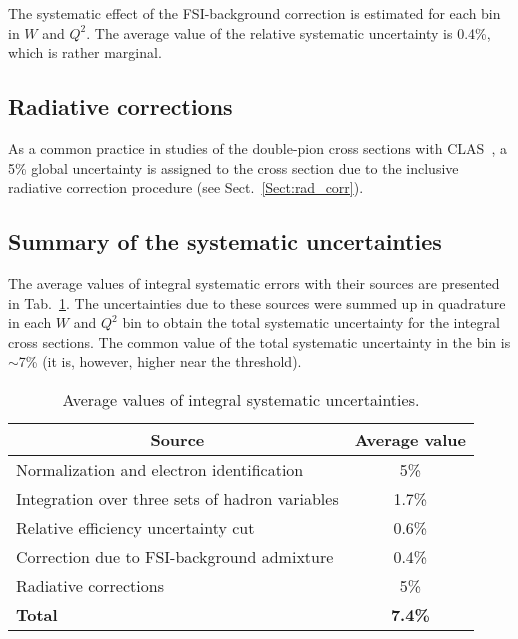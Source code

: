 The systematic effect of the FSI-background correction is estimated for each bin in $W$ and $Q^{2}$. The average value of the relative systematic uncertainty is 0.4\%, which is rather marginal.


\subsection*{Radiative corrections}


As a common practice in studies of the double-pion cross sections with CLAS~\cite{Rip_an_note:2002,Ripani:2002ss,Fed_an_note:2007,Fedotov:2008aa,Isupov:2017lnd,Arjun,Fed_an_note:2017,Fed_paper_2018}, a 5\% global uncertainty is assigned to the cross section due to the inclusive radiative correction procedure (see Sect.~\ref{Sect:rad_corr}).


\subsection*{Summary of the systematic uncertainties}

The average values of integral systematic errors with their sources are presented in Tab.~\ref{tab:sys_err}. The uncertainties due to these sources were summed up in quadrature in each $W$ and $Q^{2}$ bin to obtain the total systematic uncertainty for the integral cross sections. The common value of the total systematic uncertainty in the bin is $\sim$7\% (it is, however, higher near the threshold).

\begin{table}[htp]
\begin{center}
\caption{\small Average values of integral systematic uncertainties. \label{tab:sys_err}}
\begin{tabular}{|l|c|}

\hline
\multicolumn{1}{|c|}{Source} & Average value \\ \hline
Normalization and electron identification & 5\% \\ \hline
Integration over three sets of hadron variables & 1.7\%\\ \hline 
Relative efficiency uncertainty cut & 0.6\%\\ \hline 
Correction due to FSI-background admixture & 0.4\%\\ \hline 
Radiative corrections & 5\% \\ \hline 
\bf{Total} & \bf{7.4}\% \\ \hline 
\end{tabular}
\end{center}
\end{table} 



